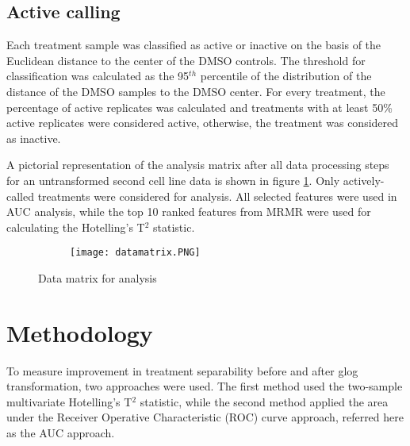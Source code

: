 \documentclass[11pt]{article}
\begin{document}
\subsection{Active calling}\label{acalling}
\par{Each treatment sample was classified as active or inactive on the basis of the Euclidean distance to the center of the DMSO controls. The threshold for classification was calculated as the 95$^{th}$ percentile of the distribution of the distance of the DMSO samples to the DMSO center. For every treatment, the percentage of active replicates was calculated and treatments with at least 50\% active replicates were considered active, otherwise, the treatment was considered as inactive. }
\par{A pictorial representation of the analysis matrix after all data processing steps for an untransformed second cell line data is shown in figure \ref{datamatrix}. Only actively-called treatments were considered for analysis. All selected features were used in AUC analysis, while the top 10 ranked features from MRMR were used for calculating the Hotelling's T$^2$ statistic.}

\begin{figure}[ht!] 
  \begin{subfigure}[b]{0.75\linewidth}
    \centering
    \texttt{[image: datamatrix.PNG]} 
     \vspace{1ex}
  \end{subfigure}%
  \caption{Data matrix for analysis}
  \label{datamatrix} 
\end{figure}
\vspace{1cm}
\clearpage
\section{Methodology}\label{methodology}
\par{To measure improvement in treatment separability before and after glog transformation, two approaches were used. The first method used the two-sample multivariate Hotelling's T$^2$ statistic, while the second method applied the area under the Receiver Operative Characteristic (ROC) curve approach, referred here as the AUC approach. }
\end{document}
